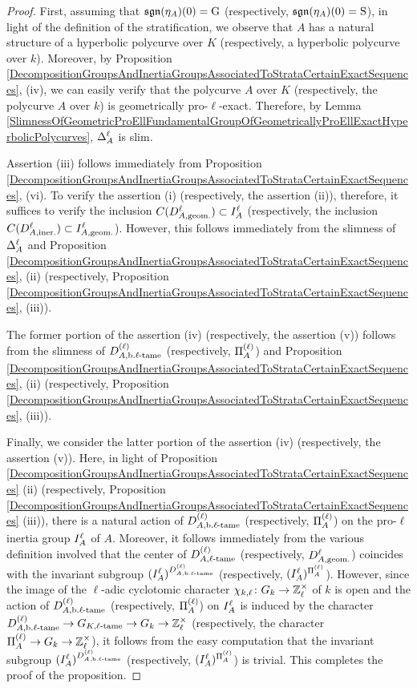 \begin{proof}
  First, assuming that $\mathfrak{sgn}(\eta_A)(0) = \mathrm{G}$ (respectively, $\mathfrak{sgn}(\eta_A)(0) = \mathrm{S}$), in light of the definition of the stratification, we observe that $A$ has a natural structure of a hyperbolic polycurve over $K$ (respectively, a hyperbolic polycurve over $k$). Moreover, by Proposition \ref{DecompositionGroupsAndInertiaGroupsAssociatedToStrataCertainExactSequences}, (iv), we can easily verify that the polycurve $A$ over $K$ (respectively, the polycurve $A$ over $k$) is geometrically pro-$\ell$-exact. Therefore, by Lemma \ref{SlimnessOfGeometricProEllFundamentalGroupOfGeometricallyProEllExactHyperbolicPolycurves}, $\Delta_{A}^\ell$ is slim.

  Assertion (iii) follows immediately from Proposition \ref{DecompositionGroupsAndInertiaGroupsAssociatedToStrataCertainExactSequences}, (vi). To verify the assertion (i) (respectively, the assertion (ii)), therefore, it suffices to verify the inclusion $C(D^{\ell}_{A, \text{geom.}}) \subset I^{\ell}_{A}$ (respectively, the inclusion $C(D^{\ell}_{A, \text{iner.}}) \subset I^{\ell}_{A, \text{geom.}}$). However, this follows immediately from the slimness of $\Delta_{A}^\ell$ and Proposition \ref{DecompositionGroupsAndInertiaGroupsAssociatedToStrataCertainExactSequences}, (ii) (respectively, Proposition \ref{DecompositionGroupsAndInertiaGroupsAssociatedToStrataCertainExactSequences}, (iii)).

  The former portion of the assertion (iv) (respectively, the assertion (v)) follows from the slimness of $D^{(\ell)}_{A, \text{b.} \ell\text{-tame}}$ (respectively, $\Pi^{(\ell)}_{A}$) and Proposition \ref{DecompositionGroupsAndInertiaGroupsAssociatedToStrataCertainExactSequences}, (ii) (respectively, Proposition \ref{DecompositionGroupsAndInertiaGroupsAssociatedToStrataCertainExactSequences}, (iii)).

  Finally, we consider the latter portion of the assertion (iv) (respectively, the assertion (v)). Here, in light of Proposition \ref{DecompositionGroupsAndInertiaGroupsAssociatedToStrataCertainExactSequences} (ii) (respectively, Proposition \ref{DecompositionGroupsAndInertiaGroupsAssociatedToStrataCertainExactSequences} (iii)), there is a natural action of $D^{(\ell)}_{A, \text{b.} \ell\text{-tame}}$ (respectively, $\Pi^{(\ell)}_{A}$) on the pro-$\ell$ inertia group $I^{\ell}_{A}$ of $A$. Moreover, it follows immediately from the various definition involved that the center of $D^{(\ell)}_{A, \ell\text{-tame}}$ (respectively, $D^{\ell}_{A, \text{geom.}}$) coincides with the invariant subgroup $(I^{\ell}_{A})^{D^{(\ell)}_{A, \text{b.} \ell\text{-tame}}}$ (respectively, $(I^{\ell}_{A})^{\Pi^{(\ell)}_{A}}$). However, since the image of the $\ell$-adic cyclotomic character $\chi_{k, \ell} \colon G_k \to \mathbb{Z}_\ell^\times$ of $k$ is open and the action of $D^{(\ell)}_{A, \text{b.} \ell\text{-tame}}$ (respectively, $\Pi^{(\ell)}_{A}$) on $I^{\ell}_{A}$ is induced by the character $D^{(\ell)}_{A, \text{b.} \ell\text{-tame}} \to G_{K, \ell\text{-tame}} \to G_k \to \mathbb{Z}_\ell^\times$ (respectively, the character $\Pi^{(\ell)}_{A} \to G_k \to \mathbb{Z}_\ell^\times$), it follows from the easy computation that the invariant subgroup $(I^{\ell}_{A})^{D^{(\ell)}_{A, \text{b.} \ell\text{-tame}}}$ (respectively, $(I^{\ell}_{A})^{\Pi^{(\ell)}_{A}}$) is trivial. This completes the proof of the proposition.
\end{proof}

